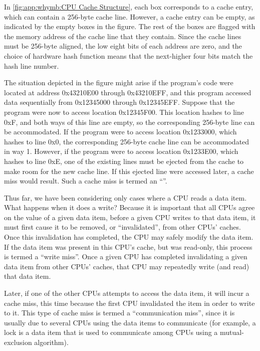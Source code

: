 In \cref{fig:app:whymb:CPU Cache Structure},
each box corresponds to a cache entry, which
can contain a 256-byte cache line.
However, a cache entry can be empty, as indicated by the empty boxes
in the figure.
The rest of the boxes are flagged with the memory address of the cache line
that they contain.
Since the cache lines must be 256-byte aligned, the low eight bits of
each address are
zero, and the choice of hardware hash function means that the next-higher
four bits match the hash line number.

The situation depicted in the figure might arise if the program's code
were located at address 0x43210E00 through 0x43210EFF, and this program
accessed data sequentially from 0x12345000 through 0x12345EFF.
Suppose that the program were now to access location 0x12345F00.
This location hashes to line 0xF, and both ways of this line are
empty, so the corresponding 256-byte line can be accommodated.
If the program were to access location 0x1233000, which hashes to line
0x0, the corresponding 256-byte cache line can be accommodated in
way 1.
However, if the program were to access location 0x1233E00, which hashes
to line 0xE, one of the existing lines must be ejected from the cache
to make room for the new cache line.
If this ejected line were accessed later, a cache miss would result.
Such a cache miss is termed an
``''.

Thus far, we have been considering only cases where a CPU reads
a data item.
What happens when it does a write?
Because it is important that all CPUs agree on the value of a given
data item, before a given CPU writes to that data item, it must first
cause it to be removed, or ``invalidated'', from other CPUs' caches.
Once this invalidation has completed, the CPU may safely modify the
data item.
If the data item was present in this CPU's cache, but was read-only,
this process is termed a ``write miss''.
Once a given CPU has completed invalidating a given data item from other
CPUs' caches, that CPU may repeatedly write (and read) that data item.

Later, if one of the other CPUs attempts to access the data item, it
will incur a cache miss, this time because the first CPU invalidated
the item in order to write to it.
This type of cache miss is termed a ``communication miss'', since it
is usually due to several CPUs using the data items to communicate
(for example, a lock is a data item that is used to communicate among
CPUs using a mutual-exclusion algorithm).

